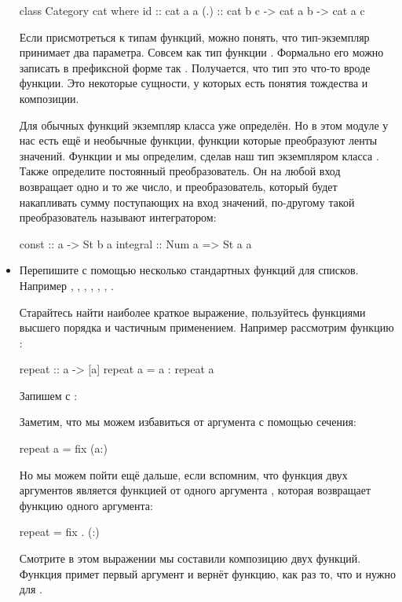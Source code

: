 \begin{itemize}
  \begin{code}
  class Category cat where
          id  :: cat a a
          (.) :: cat b c -> cat a b -> cat a c
  \end{code}

  Если присмотреться к типам функций, можно понять, что тип-экземпляр
   принимает два параметра. Совсем как тип функции
  . Формально его можно записать в префиксной форме так
  . Получается, что тип  это что-то вроде функции.
  Это некоторые сущности, у которых есть понятия тождества и композиции.

  Для обычных функций экземпляр класса  уже определён. Но в
  этом модуле у нас есть ещё и необычные функции, функции которые
  преобразуют ленты значений. Функции  и  мы определим,
  сделав наш тип  экземпляром класса . Также
  определите постоянный преобразователь. Он на любой вход возвращает
  одно и то же число, и преобразователь, который будет накапливать сумму
  поступающих на вход значений, по-другому такой преобразователь
  называют интегратором:


  \begin{code}
  const    :: a -> St b a
  integral :: Num a => St a a
  \end{code}
\item
  Перепишите с помощью  несколько стандартных функций для
  списков. Например , , , ,
  , , .

  Старайтесь найти наиболее краткое выражение, пользуйтесь функциями
  высшего порядка и частичным применением. Например рассмотрим функцию
  :


  \begin{code}
  repeat :: a -> [a]
  repeat a = a : repeat a
  \end{code}

  Запишем с :



  Заметим, что мы можем избавиться от аргумента  с помощью
  сечения:


  \begin{code}
  repeat a = fix (a:)
  \end{code}

  Но мы можем пойти ещё дальше, если вспомним, что функция двух
  аргументов \In{(:)} является функцией от одного аргумента
  , которая возвращает функцию одного
  аргумента:


  \begin{code}
  repeat = fix . (:)
  \end{code}

  Смотрите в этом выражении мы составили композицию двух функций.
  Функция \In{(:)} примет первый аргумент и вернёт функцию, как раз то,
  что и нужно для .
\end{itemize}
